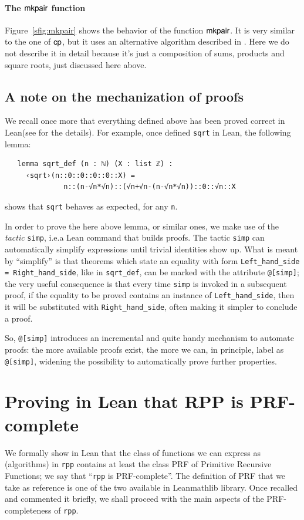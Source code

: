 \documentclass[preprint]{elsarticle}
\theoremstyle{remark}
\newcommand{\RPP}{\textsf{RPP}\xspace}
\newcommand{\PRF}{\textsf{PRF}\xspace}
\newcommand{\MATHLIB}{\textsf{mathlib}\xspace}
\newcommand{\LEAN}{\textsf{Lean}\xspace}
\begin{document}
\paragraph{The $\mathsf{mkpair}$ function}
Figure~\ref{sfig:mkpair} shows the behavior of the function $\mathsf{mkpair}$.
It is very similar to the one of $\mathsf{cp}$, but it uses an alternative algorithm described in \cite{Carneiro19}.
Here we do not describe it in detail because it's just a composition of sums, products and square roots,
just discussed here above.

\subsection{A note on the mechanization of proofs}
We recall once more that everything defined above has been proved correct in \LEAN (see \cite{MalettoRPPLEAN2021} for the details).
For example, once defined \lstinline|sqrt| in \LEAN, the following lemma:
\begin{lstlisting}
   lemma sqrt_def (n : ℕ) (X : list ℤ) :
     ‹sqrt›(n::0::0::0::0::X) =
              n::(n-√n*√n)::(√n+√n-(n-√n*√n))::0::√n::X
\end{lstlisting}
shows that \lstinline|sqrt| behaves as expected, for any \lstinline|n|.

In order to prove the here above lemma, or similar ones, we make use of the {\it tactic} \lstinline|simp|, i.e.\@ a \LEAN command that builds proofs. The tactic \lstinline|simp| can automatically simplify expressions until trivial identities show up. What is meant by ``simplify'' is that theorems which state an equality with form \texttt{Left\_hand\_side = Right\_hand\_side}, like in \lstinline|sqrt_def|,  can be marked with the attribute \lstinline|@[simp]|; the very useful consequence is that every time \lstinline|simp| is invoked in a subsequent proof, if the equality to be proved contains an instance of \texttt{Left\_hand\_side}, then it will be substituted with \texttt{Right\_hand\_side}, often making it simpler to conclude a proof.

So, \lstinline|@[simp]| introduces an incremental and quite handy mechanism to automate proofs: the more available proofs exist, the more we can, in principle, label as \lstinline|@[simp]|, widening the possibility to automatically prove further properties.



\section{Proving in \LEAN that \RPP is \PRF-complete}
\label{section:The UPRF-completeness of RPP}
We formally show in \LEAN that the class of functions we can express as (algorithms) in \lstinline|rpp| contains at least the class \PRF of Primitive Recursive Functions; we say that ``\lstinline|rpp| is \PRF-complete''. The definition of \PRF that we take as reference is one of the two available in \LEAN \MATHLIB library. Once recalled and commented it briefly, we shall proceed with the main aspects of the \PRF-completeness of \lstinline|rpp|.
\end{document}
